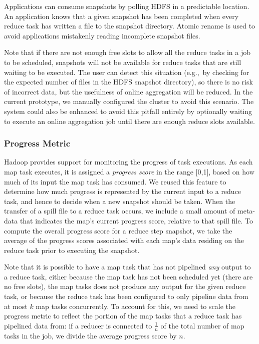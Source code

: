 Applications can consume snapshots by polling HDFS in a predictable
location. An application knows that a given snapshot has been
completed when every reduce task has written a file to the snapshot
directory.  Atomic rename is used to avoid applications mistakenly
reading incomplete snapshot files.

Note that if there are not enough free slots to allow all the reduce tasks in a
job to be scheduled, snapshots will not be available for reduce tasks that are
still waiting to be executed. The user can detect this situation (e.g.,\ by
checking for the expected number of files in the HDFS snapshot directory), so
there is no risk of incorrect data, but the usefulness of online aggregation
will be reduced. In the current prototype, we manually configured the cluster to
avoid this scenario. The system could also be enhanced to avoid this pitfall
entirely by optionally waiting to execute an online aggregation job until there
are enough reduce slots available.

\subsubsection{Progress Metric}
\label{ch:hop:sec:online-metric}

Hadoop provides support for monitoring the progress of task executions.  As
each map task executes, it is assigned a {\em progress score} in the range
[0,1], based on how much of its input the map task has consumed.  We reused
this feature to determine how much progress is represented by the current input
to a reduce task, and hence to decide when a new snapshot should be taken.
When the transfer of a spill file to a reduce task occurs, we include a small
amount of meta-data that indicates the map's current progress score, relative
to that spill file.  To compute the overall progress score for a reduce step
snapshot, we take the average of the progress scores associated with each map's
data residing on the reduce task prior to executing the snapshot. 

Note that it is possible to have a map task that has not pipelined {\em any}
output to a reduce task, either because the map task has not been scheduled yet
(there are no free {\TT} slots), the map tasks does not produce any output for
the given reduce task, or because the reduce task has been configured to only
pipeline data from at most $k$ map tasks concurrently.  To account for this, we
need to scale the progress metric to reflect the portion of the map tasks that
a reduce task has pipelined data from: if a reducer is connected to
$\frac{1}{n}$ of the total number of map tasks in the job, we divide the
average progress score by $n$.

